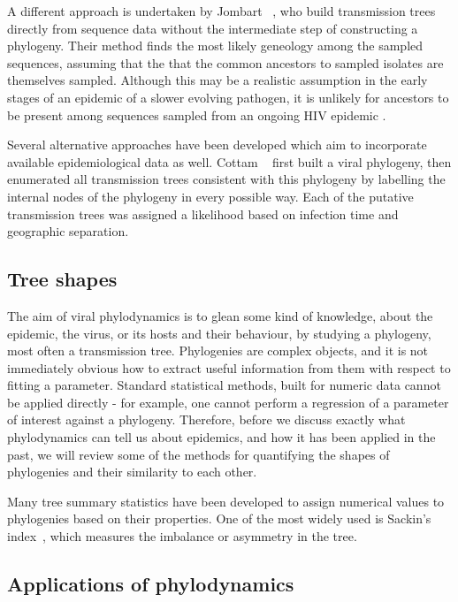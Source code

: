 A different approach is undertaken by Jombart
\etal~\autocite{jombart2011reconstructing}, who build transmission trees
directly from sequence data without the intermediate step of constructing a
phylogeny. Their method finds the most likely geneology among the sampled
sequences, assuming that the that the common ancestors to sampled isolates are
themselves sampled. Although this may be a realistic assumption in the early
stages of an epidemic of a slower evolving pathogen, it is unlikely for
ancestors to be present among sequences sampled from an ongoing HIV epidemic
.

Several alternative approaches have been developed which aim to
incorporate available epidemiological data as well. Cottam
\etal~\autocite{cottam2008integrating} first built a viral phylogeny, then
enumerated all transmission trees consistent with this phylogeny by labelling
the internal nodes of the phylogeny in every possible way. Each of the putative
transmission trees was assigned a likelihood based on infection time and
geographic separation. 


\subsection{Tree shapes}
\label{subsubsec:treeshape}

The aim of viral phylodynamics is to glean some kind of knowledge, about the
epidemic, the virus, or its hosts and their behaviour, by studying a phylogeny,
most often a transmission tree. Phylogenies are complex objects, and it is not
immediately obvious how to extract useful information from them with respect to
fitting a parameter. Standard statistical methods, built for numeric data
cannot be applied directly - for example, one cannot perform a regression of a
parameter of interest against a phylogeny. Therefore, before we discuss exactly
what phylodynamics can tell us about epidemics, and how it has been applied in
the past, we will review some of the methods for quantifying the shapes of
phylogenies and their similarity to each other.

Many tree summary statistics have been developed to assign numerical values to
phylogenies based on their properties. One of the most widely used is Sackin's
index~\cite{shao1990tree}, which measures the imbalance or asymmetry in the
tree.

\subsection{Applications of phylodynamics}
\label{subsubsec:appphylo}

